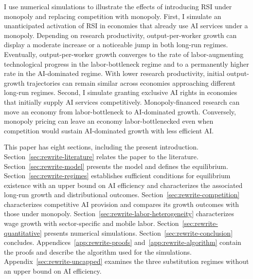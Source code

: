 I use numerical simulations to illustrate the effects of introducing RSI under monopoly and replacing competition with monopoly. First, I simulate an unanticipated activation of RSI in economies that already use AI services under a monopoly. Depending on research productivity, output-per-worker growth can display a moderate increase or a noticeable jump in both long-run regimes. Eventually, output-per-worker growth converges to the rate of labor-augmenting technological progress in the labor-bottleneck regime and to a permanently higher rate in the AI-dominated regime. With lower research productivity, initial output-growth trajectories can remain similar across economies approaching different long-run regimes. Second, I simulate granting exclusive AI rights in economies that initially supply AI services competitively. Monopoly-financed research can move an economy from labor-bottleneck to AI-dominated growth. Conversely, monopoly pricing can leave an economy labor-bottlenecked even when competition would sustain AI-dominated growth with less efficient AI. %

This paper has eight sections, including the present introduction. Section~\ref{sec:rewrite-literature} relates the paper to the literature. Section~\ref{sec:rewrite-model} presents the model and defines the equilibrium. Section~\ref{sec:rewrite-regimes} establishes sufficient conditions for equilibrium existence with an upper bound on AI efficiency and characterizes the associated long-run growth and distributional outcomes. Section~\ref{sec:rewrite-competition} characterizes competitive AI provision and compares its growth outcomes with those under monopoly. Section~\ref{sec:rewrite-labor-heterogeneity} characterizes wage growth with sector-specific and mobile labor. Section~\ref{sec:rewrite-quantitative} presents numerical simulations. Section~\ref{sec:rewrite-conclusion} concludes. Appendices~\ref{app:rewrite-proofs} and~\ref{app:rewrite-algorithm} contain the proofs and describe the algorithm used for the simulations. Appendix~\ref{sec:rewrite-uncapped} examines the three substitution regimes without an upper bound on AI efficiency.
